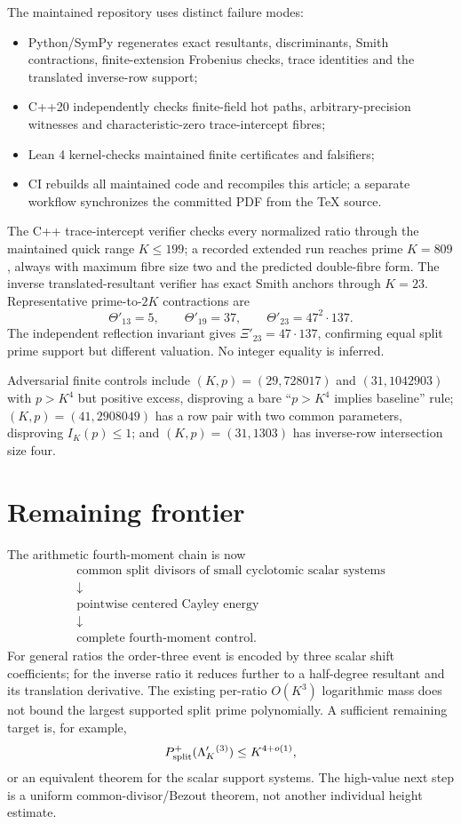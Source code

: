 \documentclass[11pt]{article}
\begin{document}
The maintained repository uses distinct failure modes:
\begin{itemize}
\item Python/SymPy regenerates exact resultants, discriminants, Smith
  contractions, finite-extension Frobenius checks, trace identities and the
  translated inverse-row support;
\item C++20 independently checks finite-field hot paths, arbitrary-precision
  witnesses and characteristic-zero trace-intercept fibres;
\item Lean 4 kernel-checks maintained finite certificates and falsifiers;
\item CI rebuilds all maintained code and recompiles this article; a separate
  workflow synchronizes the committed PDF from the TeX source.
\end{itemize}

The C++ trace-intercept verifier checks every normalized ratio through the
maintained quick range $K\le199$; a recorded extended run reaches prime
$K=809$, always with maximum fibre size two and the predicted double-fibre form.
The inverse translated-resultant verifier has exact Smith anchors through
$K=23$.  Representative prime-to-$2K$ contractions are
\[
\Theta'_{13}=5,\qquad
\Theta'_{19}=37,\qquad
\Theta'_{23}=47^2\cdot137.
\]
The independent reflection invariant gives
$\Xi'_{23}=47\cdot137$, confirming equal split prime support but different
valuation.  No integer equality is inferred.

Adversarial finite controls include $(K,p)=(29,728017)$ and $(31,1042903)$ with
$p>K^4$ but positive excess, disproving a bare ``$p>K^4$ implies baseline''
rule; $(K,p)=(41,2908049)$ has a row pair with two common parameters,
disproving $I_K(p)\le1$; and $(K,p)=(31,1303)$ has inverse-row intersection
size four.




\section{Remaining frontier}

The arithmetic fourth-moment chain is now
\[
\begin{gathered}
\boxed{\text{common split divisors of small cyclotomic scalar systems}}
\\ \downarrow \\
\boxed{\text{pointwise centered Cayley energy}}
\\ \downarrow \\
\boxed{\text{complete fourth-moment control}}.
\end{gathered}
\]
For general ratios the order-three event is encoded by three scalar shift
coefficients; for the inverse ratio it reduces further to a half-degree
resultant and its translation derivative.  The existing per-ratio
$O(K^3)$ logarithmic mass does not bound the largest supported split prime
polynomially.  A sufficient remaining target is, for example,
\[
P^+_{\rm split}(\Lambda'_K{}^{(3)})\le K^{4+o(1)},
\]
or an equivalent theorem for the scalar support systems.  The high-value next
step is a uniform common-divisor/Bezout theorem, not another individual height
estimate.
\end{document}
